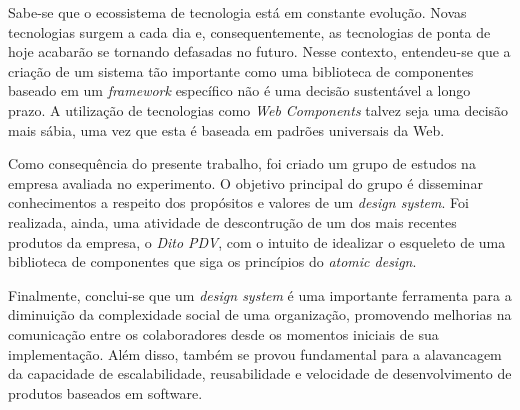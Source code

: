 Sabe-se que o ecossistema de tecnologia está em constante evolução. Novas tecnologias surgem a cada dia e, consequentemente, as tecnologias de ponta de hoje acabarão se tornando defasadas no futuro. Nesse contexto, entendeu-se que a criação de um sistema tão importante como uma biblioteca de componentes baseado em um \textit{framework} específico não é uma decisão sustentável a longo prazo. A utilização de tecnologias como \textit{Web Components} talvez seja uma decisão mais sábia, uma vez que esta é baseada em padrões universais da Web.

Como consequência do presente trabalho, foi criado um grupo de estudos na empresa avaliada no experimento. O objetivo principal do grupo é disseminar conhecimentos a respeito dos propósitos e valores de um \textit{design system}. Foi realizada, ainda, uma atividade de descontrução de um dos mais recentes produtos da empresa, o \textit{Dito PDV}, com o intuito de idealizar o esqueleto de uma biblioteca de componentes que siga os princípios do \textit{atomic design}.

Finalmente, conclui-se que um \textit{design system} é uma importante ferramenta para a diminuição da complexidade social de uma organização, promovendo melhorias na comunicação entre os colaboradores desde os momentos iniciais de sua implementação. Além disso, também se provou fundamental para a alavancagem da capacidade de escalabilidade, reusabilidade e velocidade de desenvolvimento de produtos baseados em software.
